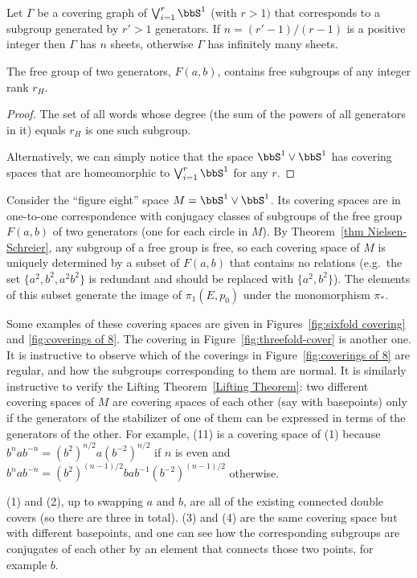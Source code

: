 \begin{cor}
    Let $\Gamma$ be a covering graph of $\bigvee_{i=1}^r \bbS^1$ (with $r>1)$ that corresponds to a subgroup generated by $r'>1$ generators. If $n=(r'-1)/(r-1)$ is a positive integer then $\Gamma$ has $n$ sheets, otherwise $\Gamma$ has infinitely many sheets.
\end{cor}
\begin{cor}
    The free group of two generators, $F(a,b)$, contains free subgroups of any integer rank $r_H$. 
\end{cor}
\begin{proof}
    The set of all words whose degree (the sum of the powers of all generators in it) equals $r_H$ is one such subgroup.

    Alternatively, we can simply notice that the space $\bbS^1\vee \bbS^1$ has covering spaces that are homeomorphic to $\bigvee_{i=1}^r \bbS^1$ for any $r$.
\end{proof}

\begin{example}
    Consider the ``figure eight'' space $M=\bbS^1\vee \bbS^1$. Its covering spaces are in one-to-one correspondence with conjugacy classes of subgroups of the free group $F(a,b)$ of two generators (one for each circle in $M$). By Theorem~\ref{thm Nielsen-Schreier}, any subgroup of a free group is free, so each covering space of $M$ is uniquely determined by a subset of $F(a,b)$ that contains no relations (e.g.\ the set $\{a^2,b^2,a^2b^2\}$ is redundant and should be replaced with $\{a^2,b^2\}$). The elements of this subset generate the image of $\pi_1(E,p_0)$ under the monomorphism $\pi_\ast$.

    Some examples of these covering spaces are given in Figures~\ref{fig:sixfold covering} and \ref{fig:coverings of 8}. The covering in Figure~\ref{fig:threefold-cover} is another one. It is instructive to observe which of the coverings in Figure~\ref{fig:coverings of 8} are regular, and how the subgroups corresponding to them are normal. It is similarly instructive to verify the Lifting Theorem~\ref{Lifting Theorem}: two different covering spaces of $M$ are covering spaces of each other (say with basepoints) only if the generators of the stabilizer of one of them can be expressed in terms of the generators of the other. For example, (11) is a covering space of (1) because  $b^nab^{-n}=(b^2)^{n/2}a(b^{-2})^{n/2}$ if $n$ is even and $b^nab^{-n}=(b^2)^{(n-1)/2}bab^{-1}(b^{-2})^{(n-1)/2}$ otherwise.

    (1) and (2), up to swapping $a$ and $b$, are all of the existing connected double covers (so there are three in total). (3) and (4) are the same covering space but with different basepoints, and one can see how the corresponding subgroups are conjugates of each other by an element that connects those two points, for example $b$.
\end{example}


